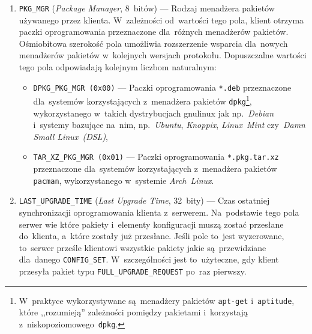 \documentclass[thesis]{subfiles}
\begin{document}
\begin{enumerate}
	\item \texttt{PKG\_MGR} (\emph{Package Manager}, 8~bitów) --- Rodzaj menadżera pakietów używanego przez klienta. W~zależności od~wartości tego pola, klient otrzyma paczki oprogramowania przeznaczone dla~różnych menadżerów pakietów. Ośmiobitowa szerokość pola umożliwia rozszerzenie wsparcia dla~nowych menadżerów pakietów w~kolejnych wersjach protokołu. Dopuszczalne wartości tego pola odpowiadają kolejnym liczbom naturalnym:
		\begin{itemize}
			\item \texttt{DPKG\_PKG\_MGR (0x00)} --- Paczki oprogramowania \texttt{*.deb} przeznaczone dla~systemów korzystających z~menadżera pakietów \texttt{dpkg}\footnote{W~praktyce wykorzystywane są~menadżery pakietów \texttt{apt-get} i~\texttt{aptitude}, które ,,rozumieją'' zależności pomiędzy pakietami i~korzystają z~niskopoziomowego~\texttt{dpkg}.}, wykorzystanego w~takich dystrybucjach \gls{gnulinux} jak np.~\emph{Debian} i~systemy bazujące na~nim, np.~\emph{Ubuntu}, \emph{Knoppix}, \emph{Linux~Mint} czy~\emph{Damn Small Linux~(DSL)},
			\item \texttt{TAR\_XZ\_PKG\_MGR (0x01)} --- Paczki oprogramowania \texttt{*.pkg.tar.xz} przeznaczone dla~systemów korzystających z~menadżera pakietów \texttt{pacman}, wykorzystanego w~systemie \emph{Arch~Linux}.
		\end{itemize}
	\item \texttt{LAST\_UPGRADE\_TIME} (\emph{Last Upgrade Time}, 32~bity) --- Czas ostatniej synchronizacji oprogramowania klienta z~serwerem. Na~podstawie tego pola serwer wie które pakiety i~elementy konfiguracji muszą zostać przesłane do~klienta, a~które zostały już przesłane. Jeśli pole to~jest wyzerowane, to~serwer prześle klientowi wszystkie pakiety jakie są~przewidziane dla~danego \texttt{CONFIG\_SET}. W~szczególności jest to~użyteczne, gdy klient przesyła pakiet typu \texttt{FULL\_UPGRADE\_REQUEST} po~raz pierwszy.
\end{enumerate}
\end{document}

